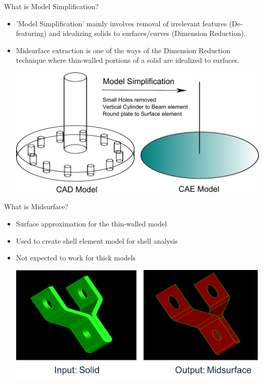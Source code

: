\begin{frame}{What is Model Simplification?}
\begin{itemize}[noitemsep,label=\textbullet,topsep=2pt,parsep=2pt,partopsep=2pt]
\item 'Model Simplification' mainly involves removal of irrelevant features (De-featuring) and idealizing solids to surfaces/curves (Dimension Reduction).
\item Midsurface extraction is one of the ways of the Dimension Reduction technique where thin-walled portions of a solid are idealized to surfaces.

\vspace{.5cm}
\includegraphics[width=0.8\linewidth]{../Common/images/ModelSimplification.pdf}
\end{itemize}
\end{frame}


\begin{frame}{What is Midsurface?}
\begin{itemize}[noitemsep,label=\textbullet,topsep=2pt,parsep=2pt,partopsep=2pt]
\item Surface approximation for the thin-walled model
\item Used to create shell element model for shell analysis
\item Not expected to work for thick models

\vspace{1cm}
\includegraphics[width=0.85\linewidth]{../Common/images/SolidToMidsurface.png}
\end{itemize}


\end{frame}


